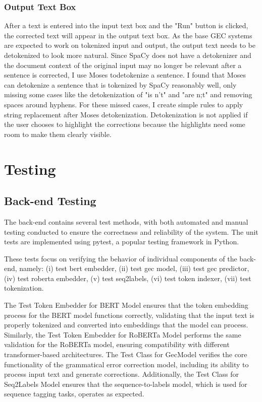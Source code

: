 \subsubsection{Output Text Box}

After a text is entered into the input text box and the "Run" button is clicked, the corrected text will appear in the output text box.
As the base GEC systems are expected to work on tokenized input and output, the output text needs to be detokenized to look more natural.
Since SpaCy does not have a detokenizer and the document context of the original input may no longer be relevant after a sentence is corrected, I use Moses todetokenize a sentence.
I found that Moses can detokenize a sentence that is tokenized by SpaCy reasonably well, only missing some cases like the detokenization of "is n't" and "are n;t" and removing spaces around hyphens.
For these missed cases, I create simple rules to apply string replacement after Moses detokenization.
Detokenization is not applied if the user chooses to highlight the corrections because the highlights need some room to make them clearly visible.

\section{Testing}

\subsection{Back-end Testing}

The back-end contains several test methods, with both automated and manual testing conducted to ensure the correctness and reliability of the system.
The unit tests are implemented using pytest, a popular testing framework in Python.

These tests focus on verifying the behavior of individual components of the back-end, namely:
(i) test bert embedder,
(ii) test gec model,
(iii) test gec predictor,
(iv) test roberta embedder,
(v) test seq2labels,
(vi) test token indexer,
(vii) test tokenization.

The Test Token Embedder for BERT Model ensures that the token embedding process for the BERT model functions correctly, validating that the input text is properly tokenized and converted into embeddings that the model can process.
Similarly, the Test Token Embedder for RoBERTa Model performs the same validation for the RoBERTa model, ensuring compatibility with different transformer-based architectures.
The Test Class for GecModel verifies the core functionality of the grammatical error correction model, including its ability to process input text and generate corrections.
Additionally, the Test Class for Seq2Labels Model ensures that the sequence-to-labels model, which is used for sequence tagging tasks, operates as expected.

